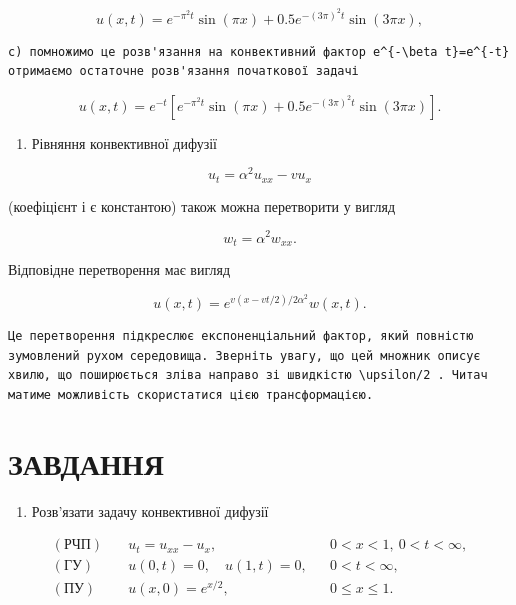 \documentclass[
  ukrainian,
]{article}
\providecommand{\tightlist}{%
  \setlength{\itemsep}{0pt}\setlength{\parskip}{0pt}}
\begin{document}
\[
u(x, t) = e^{-\pi^2 t} \sin(\pi x) + 0.5e^{-(3\pi)^2 t} \sin(3\pi x),
\]

\begin{verbatim}
c) помножимо це розв'язання на конвективний фактор e^{-\beta t}=e^{-t} отримаємо остаточне розв'язання початкової задачі
\end{verbatim}

\[
u(x, t) = e^{-t} \left[ e^{-\pi^2 t} \sin(\pi x) + 0.5e^{-(3\pi)^2 t} \sin(3\pi x) \right].
\]

\begin{enumerate}
\def\labelenumi{\arabic{enumi}.}
\setcounter{enumi}{1}
\tightlist
\item
  Рівняння конвективної дифузії
\end{enumerate}

\[
u_t = \alpha^2 u_{xx} - v u_x
\]

(коефіцієнт і є константою) також можна перетворити у вигляд

\[
w_t = \alpha^2 w_{xx}.
\]

Відповідне перетворення має вигляд

\[
u(x, t) = e^{v(x-vt/2)/2\alpha^2}w(x, t).
\]

\begin{verbatim}
Це перетворення підкреслює експоненціальний фактор, який повністю зумовлений рухом середовища. Зверніть увагу, що цей множник описує хвилю, що поширюється зліва направо зі швидкістю \upsilon/2 . Читач матиме можливість скористатися цією трансформацією.
\end{verbatim}

\section{ЗАВДАННЯ}\label{ux437ux430ux432ux434ux430ux43dux43dux44f-7}

\begin{enumerate}
\def\labelenumi{\arabic{enumi}.}
\tightlist
\item
  Розв'язати задачу конвективної дифузії
\end{enumerate}

\[
\begin{aligned}
(\text{РЧП})\quad & u_t = u_{xx} - u_x, && 0 < x < 1,\ 0 < t < \infty, \\
(\text{ГУ})\quad & u(0,t) = 0,\quad u(1,t) = 0, && 0 < t < \infty, \\
(\text{ПУ})\quad & u(x,0) = e^{x/2}, && 0 \leqslant x \leqslant 1.
\end{aligned}
\]
\end{document}

